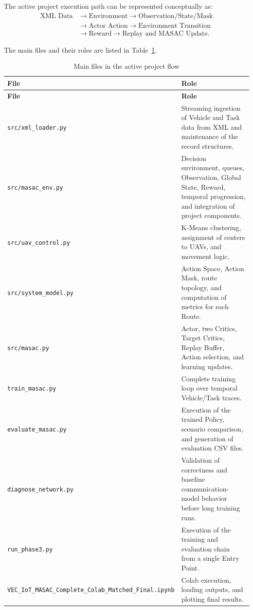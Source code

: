 \documentclass[a4paper,12pt]{article}
\newcommand{\codepath}[1]{\nolinkurl{#1}}
\begin{document}
The active project execution path can be represented conceptually as:
\[
\begin{aligned}
    \text{XML Data} &\rightarrow \text{Environment}
    \rightarrow \text{Observation/State/Mask} \\
    &\rightarrow \text{Actor Action}
    \rightarrow \text{Environment Transition} \\
    &\rightarrow \text{Reward}
    \rightarrow \text{Replay and MASAC Update}.
\end{aligned}
\]

The main files and their roles are listed in Table~\ref{tab:files}.

\begin{longtable}{p{} p{}}
    \caption{Main files in the active project flow}\label{tab:files}\\
    \toprule
    \textbf{File} & \textbf{Role}\\
    \midrule
    \endfirsthead
    \toprule
    \textbf{File} & \textbf{Role}\\
    \midrule
    \endhead
    \codepath{src/xml_loader.py} & Streaming ingestion of Vehicle and Task data from XML and maintenance of the record structures.\\
    \codepath{src/masac_env.py} & Decision environment, queues, Observation, Global State, Reward, temporal progression, and integration of project components.\\
    \codepath{src/uav_control.py} & K-Means clustering, assignment of centers to UAVs, and movement logic.\\
    \codepath{src/system_model.py} & Action Space, Action Mask, route topology, and computation of metrics for each Route.\\
    \codepath{src/masac.py} & Actor, two Critics, Target Critics, Replay Buffer, Action selection, and learning updates.\\
    \codepath{train_masac.py} & Complete training loop over temporal Vehicle/Task traces.\\
    \codepath{evaluate_masac.py} & Execution of the trained Policy, scenario comparison, and generation of evaluation CSV files.\\
    \codepath{diagnose_network.py} & Validation of correctness and baseline communication-model behavior before long training runs.\\
    \codepath{run_phase3.py} & Execution of the training and evaluation chain from a single Entry Point.\\
    \codepath{VEC_IoT_MASAC_Complete_Colab_Matched_Final.ipynb} & Colab execution, loading outputs, and plotting final results.\\
    \bottomrule
\end{longtable}
\end{document}
